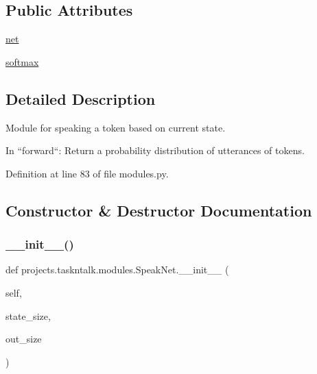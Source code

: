 \subsection*{Public Attributes}
\begin{DoxyCompactItemize}
\item 
\hyperlink{classprojects_1_1taskntalk_1_1modules_1_1SpeakNet_ad9777e1aceeb36bedb44e5bcbf9cf7c3}{net}
\item 
\hyperlink{classprojects_1_1taskntalk_1_1modules_1_1SpeakNet_aa6d9a715cdd73868cd0d57f4e5e240e0}{softmax}
\end{DoxyCompactItemize}


\subsection{Detailed Description}
\begin{DoxyVerb}Module for speaking a token based on current state.

In ``forward``: Return a probability distribution of utterances of tokens.
\end{DoxyVerb}
 

Definition at line 83 of file modules.\+py.



\subsection{Constructor \& Destructor Documentation}
\mbox{\label{classprojects_1_1taskntalk_1_1modules_1_1SpeakNet_a2ecf76584e43c792e8480146b99dc746}} 
\subsubsection{\texorpdfstring{\+\_\+\+\_\+init\+\_\+\+\_\+()}{\_\_init\_\_()}}
{\footnotesize\ttfamily def projects.\+taskntalk.\+modules.\+Speak\+Net.\+\_\+\+\_\+init\+\_\+\+\_\+ (\begin{DoxyParamCaption}\item[{}]{self,  }\item[{}]{state\+\_\+size,  }\item[{}]{out\+\_\+size }\end{DoxyParamCaption})}



